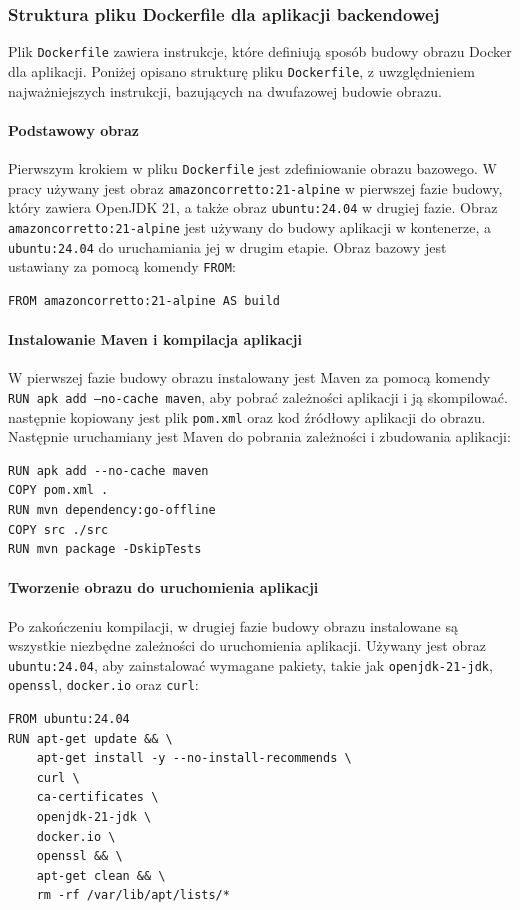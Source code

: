 \subsubsection{Struktura pliku Dockerfile dla aplikacji backendowej}

Plik \texttt{Dockerfile} zawiera instrukcje, które definiują sposób budowy obrazu Docker dla aplikacji. Poniżej opisano strukturę pliku \texttt{Dockerfile}, z uwzględnieniem najważniejszych instrukcji, bazujących na dwufazowej budowie obrazu.

\paragraph{Podstawowy obraz}
Pierwszym krokiem w pliku \texttt{Dockerfile} jest zdefiniowanie obrazu bazowego. W pracy używany jest obraz \texttt{amazoncorretto:21-alpine} w pierwszej fazie budowy, który zawiera OpenJDK 21, a także obraz \texttt{ubuntu:24.04} w drugiej fazie. Obraz \texttt{amazoncorretto:21-alpine} jest używany do budowy aplikacji w kontenerze, a \texttt{ubuntu:24.04} do uruchamiania jej w drugim etapie. Obraz bazowy jest ustawiany za pomocą komendy \texttt{FROM}:
\begin{lstlisting}[basicstyle=\footnotesize\ttfamily]
FROM amazoncorretto:21-alpine AS build
\end{lstlisting}

\paragraph{Instalowanie Maven i kompilacja aplikacji}
W pierwszej fazie budowy obrazu instalowany jest Maven za pomocą komendy \texttt{RUN apk add --no-cache maven}, aby pobrać zależności aplikacji i ją skompilować. następnie kopiowany jest plik \texttt{pom.xml} oraz kod źródłowy aplikacji do obrazu. Następnie uruchamiany jest Maven do pobrania zależności i zbudowania aplikacji:
\begin{lstlisting}[basicstyle=\footnotesize\ttfamily]
RUN apk add --no-cache maven
COPY pom.xml .
RUN mvn dependency:go-offline
COPY src ./src
RUN mvn package -DskipTests
\end{lstlisting}

\paragraph{Tworzenie obrazu do uruchomienia aplikacji}
Po zakończeniu kompilacji, w drugiej fazie budowy obrazu instalowane są wszystkie niezbędne zależności do uruchomienia aplikacji. Używany jest obraz \texttt{ubuntu:24.04}, aby zainstalować wymagane pakiety, takie jak \texttt{openjdk-21-jdk}, \texttt{openssl}, \texttt{docker.io} oraz \texttt{curl}:
\begin{lstlisting}[basicstyle=\footnotesize\ttfamily]
FROM ubuntu:24.04
RUN apt-get update && \
    apt-get install -y --no-install-recommends \
    curl \
    ca-certificates \
    openjdk-21-jdk \
    docker.io \
    openssl && \
    apt-get clean && \
    rm -rf /var/lib/apt/lists/*
\end{lstlisting}

